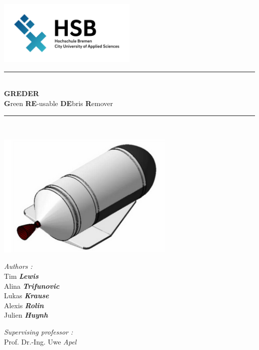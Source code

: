\documentclass[a4paper,12pt,calibri,oneside,openany]{book}
\theoremstyle{break}
\begin{document}
\renewcommand{\bibname}{Bibliographie et Webographie}

\begin{titlepage}
\begin{center}

\includegraphics[width=0.5\textwidth]{logohsb}\\[1cm]



\rule{\linewidth}{0.5mm} \\[0.4cm]
{ \huge  \textbf{GREDER} \\[0.1cm] \textbf{G}reen \textbf{RE}-usable \textbf{DE}bris \textbf{R}emover }
\rule{\linewidth}{0.5mm} \\[1.5cm]
\begin{center}
	\includegraphics[height=6cm]{greder}
\end{center}
\vspace{0.8cm}
\noindent
\begin{minipage}{0.4\textwidth}
  \begin{flushleft} \large
    \emph{Authors :}\\
    Tim \textbf{\textit{Lewis}}\\
    Alina \textbf{\textit{Trifunovic}}\\
    Lukas \textbf{\textit{Krause}}\\
    Alexis \textbf{\textit{Rolin}}\\
    Julien \textbf{\textit{Huynh}}\
  \end{flushleft}
\end{minipage}%
\begin{minipage}{0.4\textwidth}
  \begin{flushright} \large
    \emph{Supervising professor :} \\
    Prof. Dr.-Ing. Uwe \textit{Apel}\\
  \end{flushright}
\end{minipage}


\end{center}
\end{titlepage}
\end{document}
